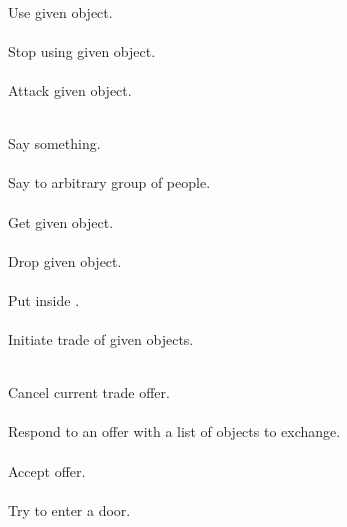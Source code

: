 \begin{protocol}
  \\
Use given object. \\

  \\
Stop using given object. \\

   \\
Attack given object. \\

   \\
Say something. \\

   \\
Say to arbitrary group of people. \\

  \\
Get given object. \\

  \\
Drop given object. \\

   \\
Put  inside . \\

   \\
Initiate trade of given objects. \\

 \\
Cancel current trade offer. \\

  \\
Respond to an offer with a list of objects to exchange. \\

 \\
Accept offer. \\

 \\
Try to enter a door. \\


\end{protocol}
